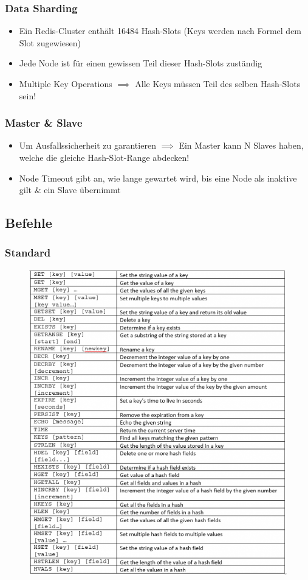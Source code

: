 \subsubsection{Data Sharding}
\begin{itemize}
    \item Ein Redis-Cluster enthält 16484 Hash-Slots (Keys werden nach Formel dem Slot zugewiesen)
    \item Jede Node ist für einen gewissen Teil dieser Hash-Slots zuständig
    \item Multiple Key Operations $\implies$ Alle Keys müssen Teil des selben Hash-Slots sein!
\end{itemize}

\subsubsection{Master \& Slave}
\begin{itemize}
    \item Um Ausfallssicherheit zu garantieren $\implies$ Ein Master kann N Slaves haben, welche die gleiche Hash-Slot-Range abdecken!
    \item Node Timeout gibt an, wie lange gewartet wird, bis eine Node als inaktive gilt \& ein Slave übernimmt
\end{itemize}

\subsection{Befehle}
\subsubsection{Standard}
\begin{figure}[H]
    \centering
    \includegraphics[scale=.8]{res/themenkorb_8/importantcommands_redis.png}
\end{figure}
